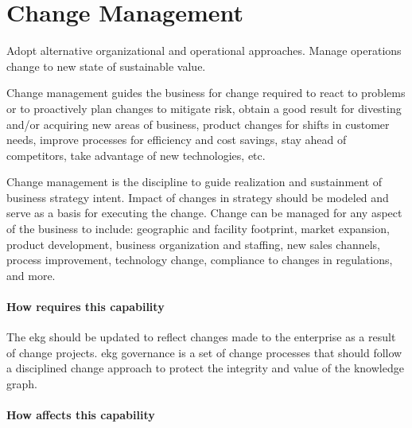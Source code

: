 \section{Change Management}
\label{sec:ekg-mm-a-2-3}
\label{sec:ekg-mm-change-management}

Adopt alternative organizational and operational approaches.
Manage operations change to new state of sustainable value.


Change management guides the business for change required to react to problems or to proactively plan changes to
mitigate risk, obtain a good result for divesting and/or acquiring new areas of business, product changes for
shifts in customer needs, improve processes for efficiency and cost savings, stay ahead of competitors,
take advantage of new technologies, etc.

Change management is the discipline to guide realization and sustainment of business strategy intent.
Impact of changes in strategy should be modeled and serve as a basis for executing the change.
Change can be managed for any aspect of the business to include: geographic and facility footprint, market expansion,
product development, business organization and staffing, new sales channels, process improvement, technology change,
compliance to changes in regulations, and more.

\ekgmmContextSection

\paragraph*{How  requires this capability}
The \gls{ekg} should be updated to reflect changes made to the enterprise as a result of change projects.
\gls{ekg} governance is a set of change processes that should follow a
disciplined change approach to protect the integrity and value of the knowledge graph.

\paragraph{How  affects this capability}

